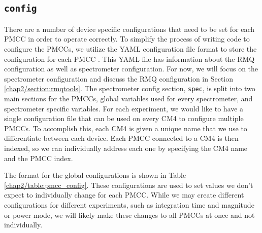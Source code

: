 \subsection{\texttt{config}}
There are a number of device specific configurations that need to be set for each PMCC in order to operate correctly.
To simplify the process of writing code to configure the PMCCs, we utilize the YAML configuration file format to store the configuration for each PMCC \citep{yaml}.
This YAML file has information about the RMQ configuration as well as spectrometer configuration. 
For now, we will focus on the spectrometer configuration and discuss the RMQ configuration in Section \ref{chap2/section:rmqtools}.
The spectrometer config section, \texttt{spec}, is split into two main sections for the PMCCs, global variables used for every spectrometer, and spectrometer specific variables.
For each experiment, we would like to have a single configuration file that can be used on every CM4 to configure multiple PMCCs. 
To accomplish this, each CM4 is given a unique name that we use to differentiate between each device. 
Each PMCC connected to a CM4 is then indexed, so we can individually address each one by specifying the CM4 name and the PMCC index.

The format for the global configurations is shown in Table \ref{chap2/table:pmcc_config}.
These configurations are used to set values we don't expect to individually change for each PMCC.
While we may create different configurations for different experiments, such as integration time and magnitude or power mode, we will likely make these changes to all PMCCs at once and not individually.

